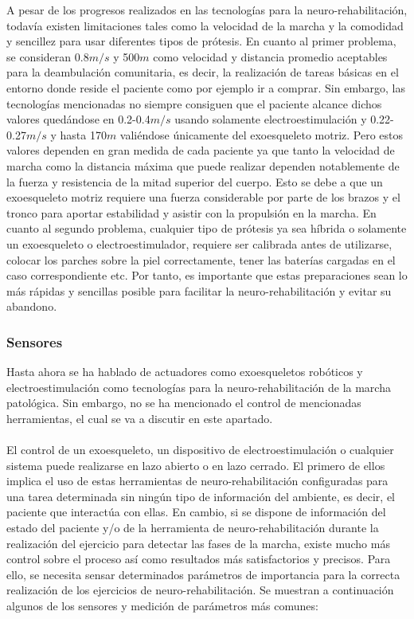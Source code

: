 A pesar de los progresos realizados en las tecnologías para la neuro-rehabilitación, todavía existen limitaciones tales como la velocidad de la marcha y la comodidad y sencillez para usar diferentes tipos de prótesis. En cuanto al primer problema, se consideran 0.8$m/s$ y 500$m$ como velocidad y distancia promedio aceptables para la deambulación comunitaria\cite{requerimientos_ambulacion_1}\cite{requerimientos_ambulacion_2}, es decir, la realización de tareas básicas en el entorno donde reside el paciente como por ejemplo ir a comprar. Sin embargo, las tecnologías mencionadas no siempre consiguen que el paciente alcance dichos valores quedándose en 0.2-0.4$m/s$ usando solamente electroestimulación\cite{velocidad_FES} y 0.22-0.27$m/s$\cite{velocidad_exoesqueleto_1}\cite{velocidad_exoesqueleto_2} y hasta 170$m$\cite{distancia_exoesqueleto} valiéndose únicamente del exoesqueleto motriz. Pero estos valores dependen en gran medida de cada paciente ya que tanto la velocidad de marcha como la distancia máxima que puede realizar dependen notablemente de la fuerza y resistencia de la mitad superior del cuerpo. Esto se debe a que un exoesqueleto motriz requiere una fuerza considerable por parte de los brazos y el tronco para aportar estabilidad y asistir con la propulsión en la marcha. En cuanto al segundo problema, cualquier tipo de prótesis ya sea híbrida o solamente un exoesqueleto o electroestimulador, requiere ser calibrada antes de utilizarse, colocar los parches sobre la piel correctamente, tener las baterías cargadas en el caso correspondiente etc. Por tanto, es importante que estas preparaciones sean lo más rápidas y sencillas posible para facilitar la neuro-rehabilitación y evitar su abandono.


\subsubsection{Sensores}

Hasta ahora se ha hablado de actuadores como exoesqueletos robóticos y electroestimulación como tecnologías para la neuro-rehabilitación de la marcha patológica. Sin embargo, no se ha mencionado el control de mencionadas herramientas, el cual se va a discutir en este apartado. 
\\
\\
El control de un exoesqueleto, un dispositivo de electroestimulación o cualquier sistema puede realizarse en lazo abierto o en lazo cerrado. El primero de ellos implica el uso de estas herramientas de neuro-rehabilitación configuradas para una tarea determinada sin ningún tipo de información del ambiente, es decir, el paciente que interactúa con ellas. En cambio, si se dispone de información del estado del paciente y/o de la herramienta de neuro-rehabilitación durante la realización del ejercicio para detectar las fases de la marcha, existe mucho más control sobre el proceso así como resultados más satisfactorios y precisos. Para ello, se necesita sensar determinados parámetros de importancia para la correcta realización de los ejercicios de neuro-rehabilitación. Se muestran a continuación algunos de los sensores y medición de parámetros más comunes\cite{sensores}:

